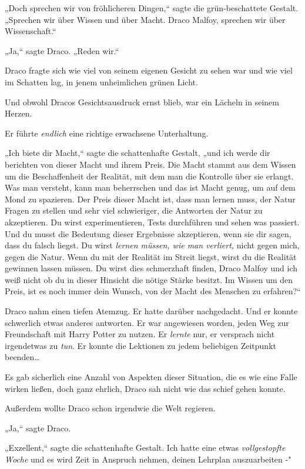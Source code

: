 {„Doch sprechen wir von fröhlicheren Dingen,“ sagte die grün-beschattete Gestalt. „Sprechen wir über Wissen und über Macht. Draco Malfoy, sprechen wir über Wissenschaft.“

„Ja,“ sagte Draco. „Reden wir.“

Draco fragte sich wie viel von seinem eigenen Gesicht zu sehen war und wie viel im Schatten lag, in jenem unheimlichen grünen Licht.

Und obwohl Dracos Gesichtsausdruck ernst blieb, war ein Lächeln in seinem Herzen.

Er führte \emph{endlich} eine richtige erwachsene Unterhaltung.

„Ich biete dir Macht,“ sagte die schattenhafte Gestalt, „und ich werde dir berichten von dieser Macht und ihrem Preis. Die Macht stammt aus dem Wissen um die Beschaffenheit der Realität, mit dem man die Kontrolle über sie erlangt. Was man versteht, kann man beherrschen und das ist Macht genug, um auf dem Mond zu spazieren. Der Preis dieser Macht ist, dass man lernen muss, der Natur Fragen zu stellen und sehr viel schwieriger, die Antworten der Natur zu akzeptieren. Du wirst experimentieren, Tests durchführen und sehen was passiert. Und du musst die Bedeutung dieser Ergebnisse akzeptieren, wenn sie dir sagen, dass du falsch liegst. Du wirst \emph{lernen müssen, wie man verliert,} nicht gegen mich, gegen die Natur. Wenn du mit der Realität im Streit liegst, wirst du die Realität gewinnen lassen müssen. Du wirst dies schmerzhaft finden, Draco Malfoy und ich weiß nicht ob du in dieser Hinsicht die nötige Stärke besitzt. Im Wissen um den Preis, ist es noch immer dein Wunsch, von der Macht des Menschen zu erfahren?“

Draco nahm einen tiefen Atemzug. Er hatte darüber nachgedacht. Und er konnte schwerlich etwas anderes antworten. Er war angewiesen worden, jeden Weg zur Freundschaft mit Harry Potter zu nutzen. Er \emph{lernte} nur, er versprach nicht irgendetwas zu \emph{tun}. Er konnte die Lektionen zu jedem beliebigen Zeitpunkt beenden…

Es gab sicherlich eine Anzahl von Aspekten dieser Situation, die es wie eine Falle wirken ließen, doch ganz ehrlich, Draco sah nicht wie das schief gehen konnte.

Außerdem wollte Draco schon irgendwie die Welt regieren.

„Ja,“ sagte Draco.

„Exzellent,“ sagte die schattenhafte Gestalt. Ich hatte eine etwas \emph{vollgestopfte Woche} und es wird Zeit in Anspruch nehmen, deinen Lehrplan auszuarbeiten -"

}
